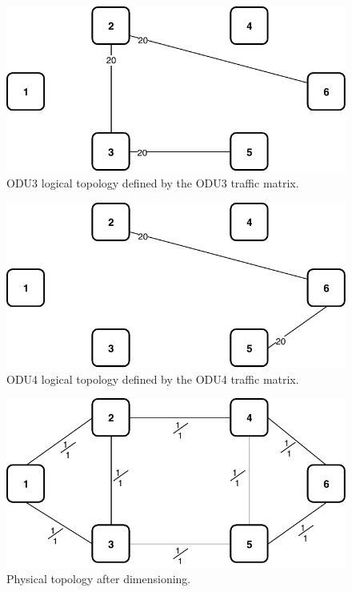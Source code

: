 \begin{figure}[h!]
\centering
\includegraphics[width=12cm]{sdf/ilp/transparent_protection/figures/logical_topology_ODU3_high}
\caption{ODU3 logical topology defined by the ODU3 traffic matrix.}
\label{logical2_ODU3_protectionhigh}
\end{figure}

\begin{figure}[h!]
\centering
\includegraphics[width=12cm]{sdf/ilp/transparent_protection/figures/logical_topology_ODU4_high}
\caption{ODU4 logical topology defined by the ODU4 traffic matrix.}
\label{logical2_ODU4_protectionhigh}
\end{figure}

\newpage
\begin{figure}[h!]
\centering
\includegraphics[width=12cm]{sdf/ilp/transparent_protection/figures/physical_topology}
\caption{Physical topology after dimensioning.}
\label{physical2_protectionhigh}
\end{figure}

